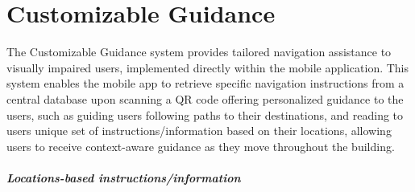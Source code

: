 \section{Customizable Guidance}

The Customizable Guidance system provides tailored navigation assistance to visually impaired users, implemented directly within the mobile application. This system enables the mobile app to retrieve specific navigation instructions from a central database upon scanning a QR code offering personalized guidance to the users, such as guiding users following paths to their destinations, and reading to users unique set of instructions/information based on their locations, allowing users to receive context-aware guidance as they move throughout the building.

\subparagraph{Locations-based instructions/information}

